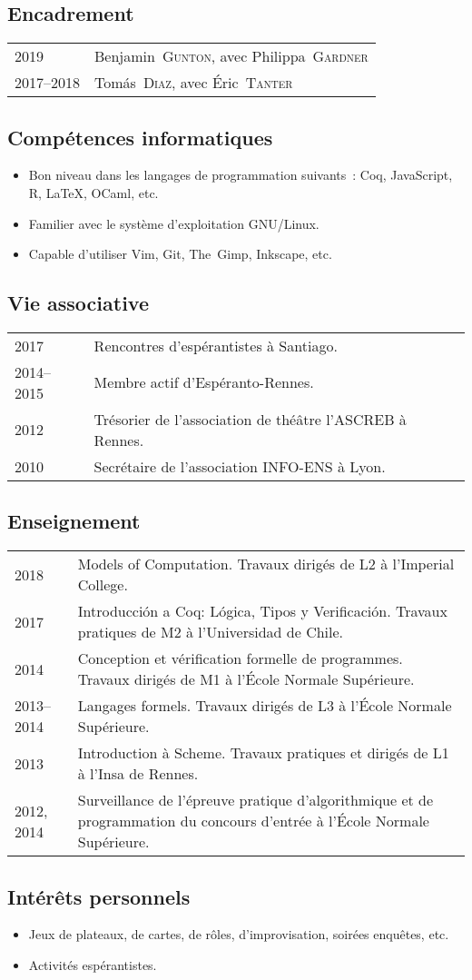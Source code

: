 \documentclass[12pt,a4paper]{article}
\makeatletter
\newcommand{\en}[1]{\foreignlanguage{english}{{#1}}}
\newcommand{\es}[1]{\foreignlanguage{spanish}{{#1}}}
\newcommand{\en}[1]{\foreignlanguage{english}{{#1}}}
\newcommand{\es}[1]{\foreignlanguage{spanish}{{#1}}}
\newenvironment{datecvsection}[1]%
               {\subsection*{#1}%
                 \noindent \begin{tabular}{@{}p{\annee}p{\texte}@{}}}
               {\end{tabular}}
\newenvironment{itemcvsection}[1]%
               {\subsection*{#1}\begin{itemize}}
               {\end{itemize}}
\newcommand\familyName{\textsc}
\newcommand\placeName{}
\makeatother
\begin{document}
\begin{datecvsection}{Encadrement}

    2019 & Benjamin~\familyName{Gunton}, avec Philippa~\familyName{Gardner} \\
    2017–2018 & Tomás~\familyName{Diaz}, avec Éric~\familyName{Tanter} \\

\end{datecvsection}

\begin{itemcvsection}{Compétences informatiques}

  \item Bon niveau dans les langages de programmation suivants~:  Coq, JavaScript, R, \LaTeX, OCaml, etc.
  \item Familier avec le système d’exploitation GNU/Linux.
  \item Capable d’utiliser Vim, Git, The~Gimp, Inkscape, etc.

\end{itemcvsection}

\begin{datecvsection}{Vie associative}

    2017 & Rencontres d’espérantistes à \placeName{Santiago}. \\
    2014–2015 & Membre actif d’{Espéranto-Rennes}. \\
	2012 & Trésorier de l’association de théâtre l’{ASCREB} à \placeName{Rennes}. \\
    2010 & Secrétaire de l’association \textsc{INFO-ENS} à \placeName{Lyon}. \\

\end{datecvsection}

\begin{datecvsection}{Enseignement}

    2018 & Models of Computation. Travaux dirigés de L2 à l’\en{\placeName{Imperial College}}. \\

    2017 & Introducción a Coq: Lógica, Tipos y Verificación. Travaux pratiques de M2 à l’\es{\placeName{Universidad de Chile}}. \\

    2014 & Conception et vérification formelle de programmes. Travaux dirigés de M1 à l’\placeName{École Normale Supérieure}. \\

    2013–2014 & Langages formels. Travaux dirigés de L3 à l’\placeName{École Normale Supérieure}. \\

    2013 & Introduction à Scheme. Travaux pratiques et dirigés de L1 à l’\placeName{Insa} de \placeName{Rennes}. \\

    2012, 2014 & Surveillance de l’épreuve pratique d’algorithmique et de programmation du concours d’entrée à l’\placeName{École Normale Supérieure}.

\end{datecvsection}

\begin{itemcvsection}{Intérêts personnels}

  \item Jeux de plateaux, de cartes, de rôles, d’improvisation, soirées enquêtes, etc.
  \item Activités espérantistes.

\end{itemcvsection}
\end{document}
